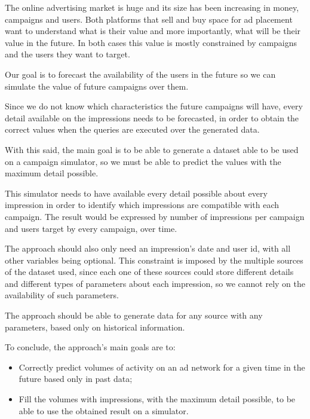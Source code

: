 The online advertising market is huge and its size has been increasing in money,
campaigns and users. Both platforms that sell and buy space for ad placement
want to understand what is their value and more importantly, what will be their
value in the future. In both cases this value is mostly constrained by campaigns
and the users they want to target.

Our goal is to forecast the availability of the users in the future so we can
simulate the value of future campaigns over them.

Since we do not know which characteristics the future campaigns will have, every
detail available on the impressions needs to be forecasted, in order to
obtain the correct values when the queries are executed over the generated data.

With this said, the main goal is to be able to generate a dataset able to be used on a campaign
simulator, so we must be able to predict the values with the maximum detail
possible.

This simulator needs to have available every detail possible about every
impression in order to identify which impressions are compatible with each
campaign. The result would be expressed by number of impressions per campaign and
users target by every campaign, over time.

The approach should also only need an impression's date and user id, with all
other variables being optional.
This constraint is imposed by the multiple sources of the dataset used, since
each one of these sources could store different details and different types of
parameters about each impression, so we cannot rely on the availability of
such parameters.

The approach should be able to generate data for any source
with any parameters, based only on historical information.

To conclude, the approach's main goals are to:
\begin{itemize}
\item Correctly predict volumes of activity on an ad network for a given time in
  the future based only in past data;
\item Fill the volumes with impressions, with the maximum detail possible, to be
  able to use the obtained result on a simulator.
\end{itemize}


